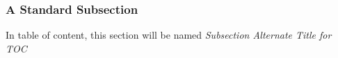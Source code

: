 \subsubsection[Subsection Alternate Title for TOC]{A Standard Subsection}
In table of content, this section will be named 
{\it Subsection Alternate Title for TOC}